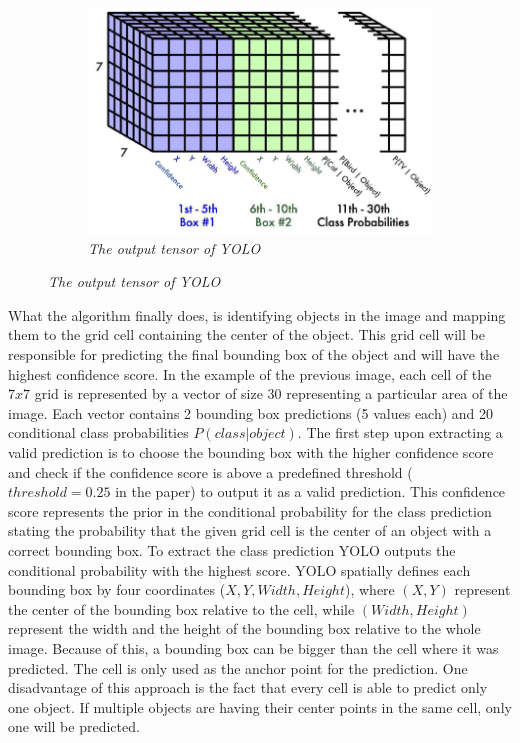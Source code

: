 \begin{figure}[H]
    \centering
    \begin{subfigure}[b]{0.6\textwidth}
        \centering
        \includegraphics[width=\textwidth]{Figures/2. Related Work/yolo_2.png}
        \caption{\textit{The output tensor of YOLO} \cite{yolo_images}}
    \end{subfigure}
\end{figure}

What the algorithm finally does, is identifying objects in the image and mapping
them to the grid cell containing the center of the object. This grid cell will
be responsible for predicting the final bounding box of the object and will have
the highest confidence score.
In the example of the previous image, each cell of the $7 x 7$ grid is
represented by a vector of size 30 representing a particular area of the image.
Each vector contains 2 bounding box predictions (5 values each) and 20
conditional class probabilities $P(class|object)$. The first step upon extracting
a valid prediction is to choose the bounding box with the higher confidence
score and check if the confidence score is above a predefined threshold 
($threshold = 0.25$ in the paper) to output it as a valid prediction. This
confidence score represents the prior in the conditional probability for the
class prediction stating the probability that the given grid cell is the center
of an object with a correct bounding box. To extract the class prediction YOLO
outputs the conditional probability with the highest score. YOLO spatially
defines each bounding box by four coordinates ($X, Y, Width, Height$), where
$(X, Y)$ represent the center of the bounding box relative to the cell, while
$(Width, Height)$ represent the width and the height of the bounding box
relative to the whole image. Because of this, a bounding box can be bigger than
the cell where it was predicted. The cell is only used as the anchor point for
the prediction. One disadvantage of this approach is the fact that every cell
is able to predict only one object. If multiple objects are having their center
points in the same cell, only one will be predicted.

